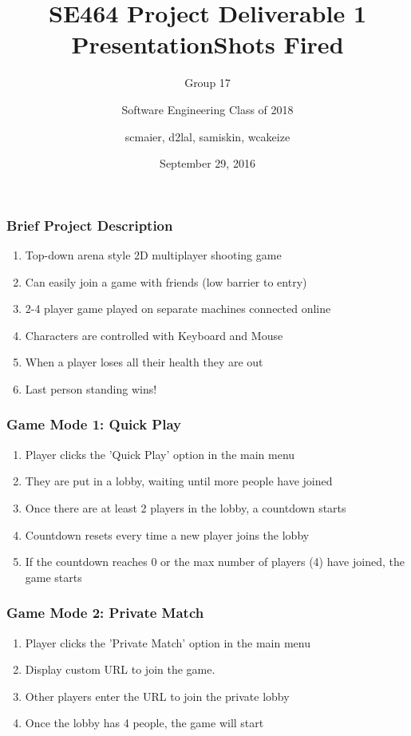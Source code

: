 \documentclass{beamer}
\title%
{SE464 Project Deliverable 1 Presentation}
\subtitle{Group 17}
\author[SE2018] %
{Software Engineering Class of 2018}
\institute[UW] %
{
  University of Waterloo
}
\date%
{September 29, 2016}
\title{Shots Fired}
\author{scmaier, d2lal, samiskin, wcakeize}
\begin{document}
\maketitle
\begin{frame}
\frametitle{Brief Project Description}
\begin{enumerate}
  \item Top-down arena style 2D multiplayer shooting game
  \item Can easily join a game with friends (low barrier to entry)
  \item 2-4 player game played on separate machines connected online
  \item Characters are controlled with Keyboard and Mouse
  \item When a player loses all their health they are out
  \item Last person standing wins!
\end{enumerate}
\end{frame}

\begin{frame}
\frametitle{Game Mode 1: Quick Play}
\begin{enumerate}
  \item Player clicks the 'Quick Play' option in the main menu
  \item They are put in a lobby, waiting until more people have joined
  \item Once there are at least 2 players in the lobby, a countdown starts
  \item Countdown resets every time a new player joins the lobby
  \item If the countdown reaches 0 or the max number of players (4) have joined, the game starts
\end{enumerate}
\end{frame}

\begin{frame}
\frametitle{Game Mode 2: Private Match}
\begin{enumerate}
  \item Player clicks the 'Private Match' option in the main menu
  \item Display custom URL to join the game.
  \item Other players enter the URL to join the private lobby
  \item Once the lobby has 4 people, the game will start
\end{enumerate}
\end{frame}
\end{document}
